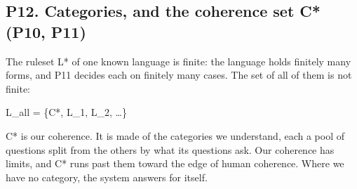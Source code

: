 \subsection{\texorpdfstring{P12. Categories, and the coherence set C* (P10, P11)}{P12. Categories, and the coherence set C (P10, P11)}}

The ruleset L* of one known language is finite: the language holds finitely many forms, and P11 decides each on finitely many cases. The set of all of them is not finite:

L\_\allowbreak{}all = \{C*, L\_\allowbreak{}1, L\_\allowbreak{}2, …\}

C* is our coherence. It is made of the categories we understand, each a pool of questions split from the others by what its questions ask. Our coherence has limits, and C* runs past them toward the edge of human coherence. Where we have no category, the system answers for itself.

